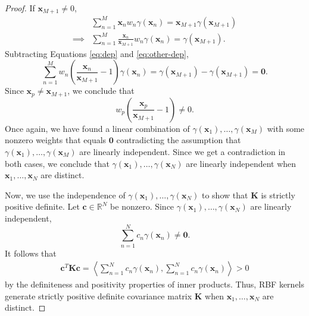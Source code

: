 \begin{proof}
    If $\mathbf{x}_{M + 1} \neq 0$,
    \begin{align}
        & \sum\limits_{n=1}^{M} \mathbf{x}_n w_n \gamma(\mathbf{x}_n) = {\mathbf{x}_{M + 1}}\gamma(\mathbf{x}_{M + 1}) \\
        \implies & \sum\limits_{n=1}^{M} \frac{\mathbf{x}_n}{\mathbf{x}_{M + 1}} w_n \gamma(\mathbf{x}_n) = \gamma(\mathbf{x}_{M + 1}). \label{eq:other-dep}
    \end{align}
    Subtracting Equations \ref{eq:dep} and \ref{eq:other-dep},
    \begin{equation*}
        \sum\limits_{n=1}^{M} w_n \left(\frac{\mathbf{x}_n}{\mathbf{x}_{M + 1}} - 1\right) \gamma(\mathbf{x}_n) = \gamma(\mathbf{x}_{M + 1}) - \gamma(\mathbf{x}_{M + 1}) = \mathbf{0}.
    \end{equation*}
    Since $\mathbf{x}_p \neq \mathbf{x}_{M + 1}$, we conclude that
    \begin{equation*}
        w_p\left(\frac{ \mathbf{x}_p }{ \mathbf{x}_{M + 1} } - 1\right) \neq 0.
    \end{equation*}
    Once again, we have found a linear combination of $\gamma(\mathbf{x}_1), \dots, \gamma(\mathbf{x}_M)$ with some nonzero weights that equals $\mathbf{0}$ contradicting the assumption that $\gamma(\mathbf{x}_1), \dots, \gamma(\mathbf{x}_M)$ are linearly independent.
    Since we get a contradiction in both cases, we conclude that $\gamma(\mathbf{x}_1), \dots, \gamma(\mathbf{x}_N)$ are linearly independent when $\mathbf{x}_1, \dots, \mathbf{x}_N$ are distinct.

    Now, we use the independence of $\gamma(\mathbf{x}_1), \dots, \gamma(\mathbf{x}_N)$ to show that $\mathbf{K}$ is strictly positive definite.
    Let $\mathbf{c} \in \mathbb{R}^{N}$ be nonzero.
    Since $\gamma(\mathbf{x}_1), \dots, \gamma(\mathbf{x}_N)$ are linearly independent,
    \begin{equation*}
        \sum\limits_{n = 1}^{N} c_n \gamma(\mathbf{x}_n) \neq \mathbf{0}.
    \end{equation*}
    It follows that
    \begin{align*}
        \mathbf{c}^{T} \mathbf{K} \mathbf{c}
        = \left\langle \sum\limits_{n = 1}^{N} c_n \gamma(\mathbf{x}_n), \sum\limits_{n = 1}^{N} c_n \gamma(\mathbf{x}_n) \right\rangle
        > 0
    \end{align*}
    by the definiteness and positivity properties of inner products.
    Thus, RBF kernels generate strictly positive definite covariance matrix $\mathbf{K}$ when $\mathbf{x}_1, \dots, \mathbf{x}_N$ are distinct.
\end{proof}

